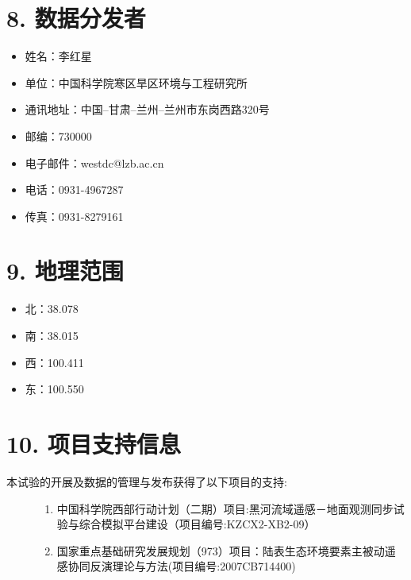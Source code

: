 \documentclass[letterpaper,10pt,english]{sphinxmanual}
\begin{document}
\section{8.      数据分发者}
\label{fecd46b0-3390-4580-a415-2d49ba77f9bd:id8}\begin{itemize}
\item {} 
姓名：李红星

\item {} 
单位：中国科学院寒区旱区环境与工程研究所

\item {} 
通讯地址：中国--甘肃--兰州--兰州市东岗西路320号

\item {} 
邮编：730000

\item {} 
电子邮件：westdc@lzb.ac.cn

\item {} 
电话：0931-4967287

\item {} 
传真：0931-8279161

\end{itemize}


\section{9.      地理范围}
\label{fecd46b0-3390-4580-a415-2d49ba77f9bd:id9}\begin{itemize}
\item {} 
北：38.078

\item {} 
南：38.015

\item {} 
西：100.411

\item {} 
东：100.550

\end{itemize}


\section{10.     项目支持信息}
\label{fecd46b0-3390-4580-a415-2d49ba77f9bd:id10}\begin{description}
\item[{本试验的开展及数据的管理与发布获得了以下项目的支持:}] \leavevmode\begin{enumerate}
\item {} 
中国科学院西部行动计划（二期）项目:黑河流域遥感－地面观测同步试验与综合模拟平台建设（项目编号:KZCX2-XB2-09）

\item {} 
国家重点基础研究发展规划（973）项目：陆表生态环境要素主被动遥感协同反演理论与方法(项目编号:2007CB714400)

\end{enumerate}

\end{description}
\end{document}
